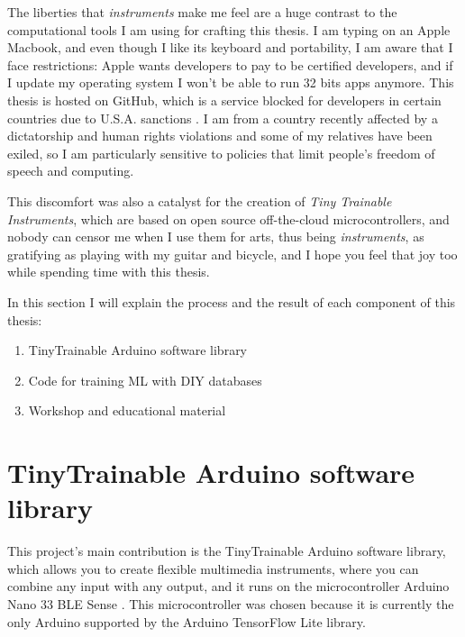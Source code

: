 The liberties that \emph{instruments} make me feel are a huge contrast to the computational tools I am using for crafting this thesis. I am typing on an Apple Macbook, and even though I like its keyboard and portability, I am aware that I face restrictions: Apple wants developers to pay to be certified developers, and if I update my operating system I won't be able to run 32 bits apps anymore. This thesis is hosted on GitHub, which is a service blocked for developers in certain countries due to U.S.A. sanctions \cite{website-github-trade-controls}. I am from a country recently affected by a dictatorship and human rights violations and some of my relatives have been exiled, so I am particularly sensitive to policies that limit people's freedom of speech and computing.

This discomfort was also a catalyst for the creation of \textit{Tiny Trainable Instruments}, which are based on open source off-the-cloud microcontrollers, and nobody can censor me when I use them for arts, thus being \emph{instruments}, as gratifying as playing with my guitar and bicycle, and I hope you feel that joy too while spending time with this thesis.

In this section I will explain the process and the result of each component of this thesis:

\begin{enumerate}
  \item TinyTrainable Arduino software library
  \item Code for training \acrshort{ML} with \acrshort{DIY} databases
  \item Workshop and educational material
\end{enumerate}

\section{TinyTrainable Arduino software library}

This project's main contribution is the TinyTrainable Arduino software library, which allows you to create flexible multimedia instruments, where you can combine any input with any output, and it runs on the microcontroller Arduino Nano 33 BLE Sense \cite{website-materials-arduino-nano-33-ble-sense}. This microcontroller was chosen because it is currently the only Arduino supported by the Arduino TensorFlow Lite library.

